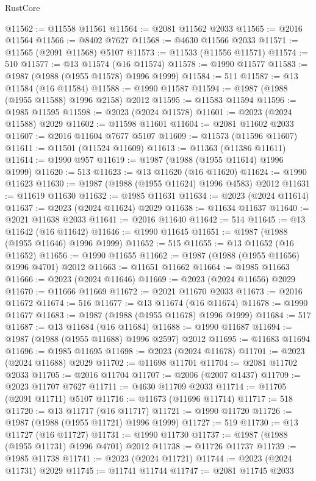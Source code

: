 \begin{lexlean}{RustCore}
\begin{coremodule}
@11562 := @11558 @11561
@11564 := @2081 @11562 @2033
@11565 := @2016 @11564
@11566 := @8402 @7627
@11568 := @4630 @11566 @2033
@11571 := @11565 (@2091 @11568) @5107
@11573 := @11533 (@11556 @11571)
@11574 := 510
@11577 := @13 @11574 (@16 @11574)
@11578 := @1990 @11577
@11583 := @1987 (@1988 (@1955 @11578) @1996 @1999)
@11584 := 511
@11587 := @13 @11584 (@16 @11584)
@11588 := @1990 @11587
@11594 := @1987 (@1988 (@1955 @11588) @1996 @2158) @2012
@11595 := @11583 @11594
@11596 := @1985 @11595
@11598 := @2023 (@2024 @11578)
@11601 := @2023 (@2024 @11588) @2029
@11602 := @11598 @11601
@11604 := @2081 @11602 @2033
@11607 := @2016 @11604 @7677 @5107
@11609 := @11573 (@11596 @11607)
@11611 := @11501 (@11524 @11609)
@11613 := @11363 (@11386 @11611)
@11614 := @1990 @957
@11619 := @1987 (@1988 (@1955 @11614) @1996 @1999)
@11620 := 513
@11623 := @13 @11620 (@16 @11620)
@11624 := @1990 @11623
@11630 := @1987 (@1988 (@1955 @11624) @1996 @4583) @2012
@11631 := @11619 @11630
@11632 := @1985 @11631
@11634 := @2023 (@2024 @11614)
@11637 := @2023 (@2024 @11624) @2029
@11638 := @11634 @11637
@11640 := @2021 @11638 @2033
@11641 := @2016 @11640
@11642 := 514
@11645 := @13 @11642 (@16 @11642)
@11646 := @1990 @11645
@11651 := @1987 (@1988 (@1955 @11646) @1996 @1999)
@11652 := 515
@11655 := @13 @11652 (@16 @11652)
@11656 := @1990 @11655
@11662 := @1987 (@1988 (@1955 @11656) @1996 @4701) @2012
@11663 := @11651 @11662
@11664 := @1985 @11663
@11666 := @2023 (@2024 @11646)
@11669 := @2023 (@2024 @11656) @2029
@11670 := @11666 @11669
@11672 := @2021 @11670 @2033
@11673 := @2016 @11672
@11674 := 516
@11677 := @13 @11674 (@16 @11674)
@11678 := @1990 @11677
@11683 := @1987 (@1988 (@1955 @11678) @1996 @1999)
@11684 := 517
@11687 := @13 @11684 (@16 @11684)
@11688 := @1990 @11687
@11694 := @1987 (@1988 (@1955 @11688) @1996 @2597) @2012
@11695 := @11683 @11694
@11696 := @1985 @11695
@11698 := @2023 (@2024 @11678)
@11701 := @2023 (@2024 @11688) @2029
@11702 := @11698 @11701
@11704 := @2081 @11702 @2033
@11705 := @2016 @11704
@11707 := @2006 (@2007 @1437)
@11709 := @2023 @11707 @7627
@11711 := @4630 @11709 @2033
@11714 := @11705 (@2091 @11711) @5107
@11716 := @11673 (@11696 @11714)
@11717 := 518
@11720 := @13 @11717 (@16 @11717)
@11721 := @1990 @11720
@11726 := @1987 (@1988 (@1955 @11721) @1996 @1999)
@11727 := 519
@11730 := @13 @11727 (@16 @11727)
@11731 := @1990 @11730
@11737 := @1987 (@1988 (@1955 @11731) @1996 @4701) @2012
@11738 := @11726 @11737
@11739 := @1985 @11738
@11741 := @2023 (@2024 @11721)
@11744 := @2023 (@2024 @11731) @2029
@11745 := @11741 @11744
@11747 := @2081 @11745 @2033

\end{coremodule}
\end{lexlean}
